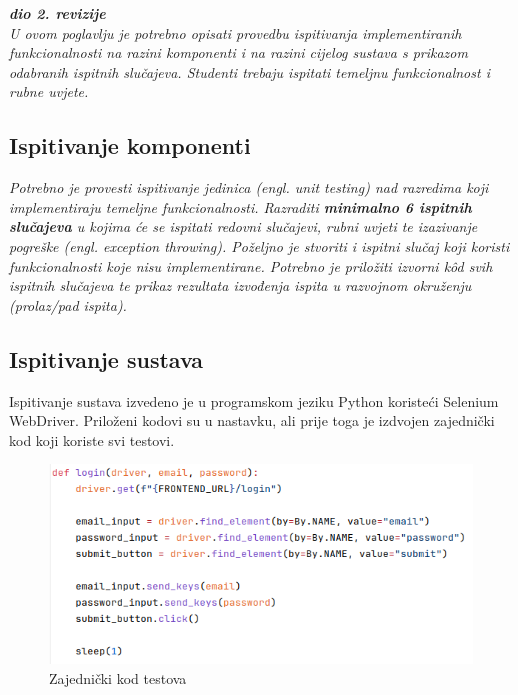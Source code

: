 			\textbf{\textit{dio 2. revizije}}\\
			
			 \textit{U ovom poglavlju je potrebno opisati provedbu ispitivanja implementiranih funkcionalnosti na razini komponenti i na razini cijelog sustava s prikazom odabranih ispitnih slučajeva. Studenti trebaju ispitati temeljnu funkcionalnost i rubne uvjete.}
	
			
			\subsection{Ispitivanje komponenti}
			\textit{Potrebno je provesti ispitivanje jedinica (engl. unit testing) nad razredima koji implementiraju temeljne funkcionalnosti. Razraditi \textbf{minimalno 6 ispitnih slučajeva} u kojima će se ispitati redovni slučajevi, rubni uvjeti te izazivanje pogreške (engl. exception throwing). Poželjno je stvoriti i ispitni slučaj koji koristi funkcionalnosti koje nisu implementirane. Potrebno je priložiti izvorni kôd svih ispitnih slučajeva te prikaz rezultata izvođenja ispita u razvojnom okruženju (prolaz/pad ispita). }
			
			
			
			\subsection{Ispitivanje sustava}
			
			Ispitivanje sustava izvedeno je u programskom jeziku Python koristeći Selenium WebDriver. Priloženi kodovi su u nastavku, ali prije toga je izdvojen zajednički kod koji koriste svi testovi.
			
			\begin{figure}[H]
				\includegraphics[width=\textwidth]{slike/selenium_common.png}
				\centering
				\caption{Zajednički kod testova}
				\label{fig:zajednicki-kod-testova}
			\end{figure}
			
